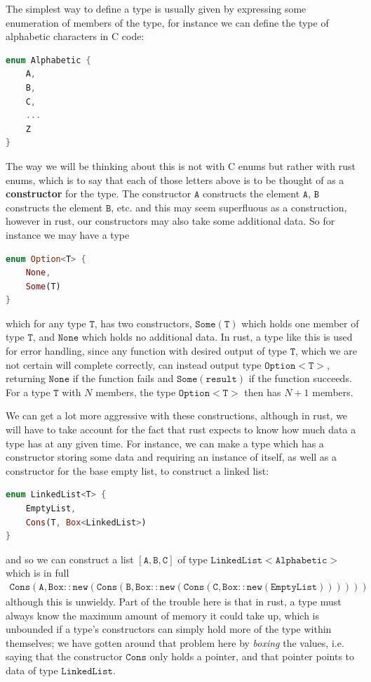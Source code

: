 \documentclass[11pt]{article}
\begin{document}
The simplest way to define a type is usually given by expressing some enumeration of members of the type, for instance we can define the type of alphabetic characters in C code: \begin{lstlisting}[language=C]
enum Alphabetic {
	A,
	B,
	C,
	...
	Z
}
\end{lstlisting}

The way we will be thinking about this is not with C enums but rather with rust enums, which is to say that each of those letters above is to be thought of as a \textbf{constructor} for the type. The constructor $\mathtt{A}$ constructs the element $\mathtt{A}$, $\mathtt{B}$ constructs the element $\mathtt{B}$, etc. and this may seem superfluous as a construction, however in rust, our constructors may also take some additional data. So for instance we may have a type \begin{lstlisting}[language=Rust]
enum Option<T> {
	None,
	Some(T)
}
\end{lstlisting}
which for any type $\mathtt{T}$, has two constructors, $\mathtt{Some(T)}$ which holds one member of type $\mathtt{T}$, and $\mathtt{None}$ which holds no additional data. In rust, a type like this is used for error handling, since any function with desired output of type $\mathtt{T}$, which we are not certain will complete correctly, can instead output type $\mathtt{Option<T>}$, returning $\mathtt{None}$ if the function fails and $\mathtt{Some(result)}$ if the function succeeds. For a type $\mathtt{T}$ with $N$ members, the type $\mathtt{Option<T>}$ then has $N+1$ members.

We can get a lot more aggressive with these constructions, although in rust, we will have to take account for the fact that rust expects to know how much data a type has at any given time. For instance, we can make a type which has a constructor storing some data and requiring an instance of itself, as well as a constructor for the base empty list, to construct a linked list: \begin{lstlisting}[language=Rust]
enum LinkedList<T> {
	EmptyList,
	Cons(T, Box<LinkedList>)
}
\end{lstlisting}
and so we can construct a list $\mathtt{[A,B,C]}$ of type $\mathtt{LinkedList<Alphabetic>}$ which is in full \begin{gather*}
\mathtt{Cons(A,Box::new(Cons(B,Box::new(Cons(C,Box::new(EmptyList)))))) }
\end{gather*}
although this is unwieldy. Part of the trouble here is that in rust, a type must always know the maximum amount of memory it could take up, which is unbounded if a type's constructors can simply hold more of the type within themselves; we have gotten around that problem here by \emph{boxing} the values, i.e. saying that the constructor $\mathtt{Cons}$ only holds a pointer, and that pointer points to data of type $\mathtt{LinkedList}$.
\end{document}
